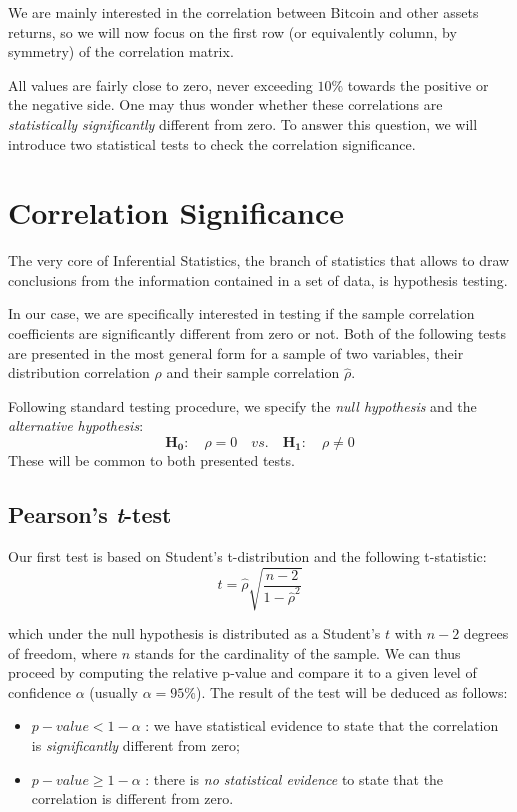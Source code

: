 We are mainly interested in the correlation between Bitcoin and other assets returns, so we will now focus on the first row (or equivalently column, by symmetry) of the correlation matrix.

All values are fairly close to zero, never exceeding $10\%$ towards the positive or the negative side. 
One may thus wonder whether these correlations are \textit{statistically significantly} different from zero.
To answer this question, we will introduce two statistical tests to check the correlation significance.


\bigskip
\section{Correlation Significance}
\label{sec:corr_significance}
The very core of Inferential Statistics, the branch of statistics that allows to draw conclusions from the information contained in a set of data, is hypothesis testing. 

In our case, we are specifically interested in testing if the sample correlation coefficients are significantly different from zero or not.
Both of the following tests are presented in the most general form for a sample of two variables, their distribution correlation $\rho$ and their sample correlation $\hat{\rho}$. 

Following standard testing procedure, we specify the \textit{null hypothesis} and the \textit{alternative hypothesis}:
\begin{equation*}
	\mathbf{H_{0}}: \quad \rho = 0 \quad vs. \quad	\mathbf{H_{1}}: \quad \rho \neq 0
\end{equation*}
These will be common to both presented tests.

\subsection{Pearson's \textit{t}-test}
Our first test is based on Student's t-distribution and the following t-statistic:
\begin{equation}
	t = \hat{\rho} \sqrt{\frac{n - 2}{1 - \hat{\rho}^2}}
\end{equation} 

which under the null hypothesis is distributed as a Student's $t$ with $n-2$ degrees of freedom, where $n$ stands for the cardinality of the sample.
We can thus proceed by computing the relative p-value and compare it to a given level of confidence $\alpha$ (usually $\alpha = 95\%$). 
The result of the test will be deduced as follows:
\begin{itemize}
	\item $p-value < 1 - \alpha$ : we have statistical evidence to state that the correlation is \textit{significantly} different from zero;
	\item $p-value \geq 1 - \alpha$ : there is \textit{no statistical evidence} to state that the correlation is different from zero.
\end{itemize}


